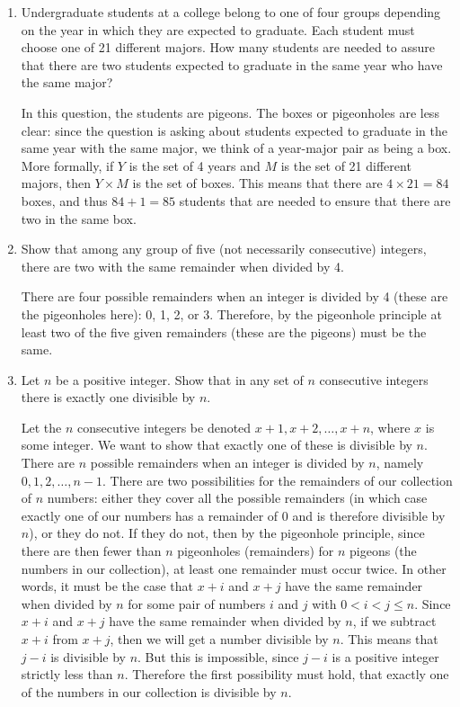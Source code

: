 \documentclass[11pt]{article}
\begin{document}
\begin{enumerate}[label=\textbf{\arabic*.}]
	\item Undergraduate students at a college belong to one of four groups depending on the year in which they are expected to graduate. Each student must choose one of 21 different majors. How many students are needed to assure that there are two students expected to graduate in the same year who have the same major?
	
	In this question, the students are pigeons. The boxes or pigeonholes are less clear: since the question is asking about students expected to graduate in the same year with the same major, we think of a year-major pair as being a box. More formally, if $Y$ is the set of 4 years and $M$ is the set of 21 different majors, then $Y \times M$ is the set of boxes. This means that there are $4 \times 21 = 84$ boxes, and thus $84 + 1 = 85$ students that are needed to ensure that there are two in the same box.
	
	\item Show that among any group of five (not necessarily consecutive) integers, there are two with the same remainder when divided by 4.
	
	There are four possible remainders when an integer is divided by 4 (these are the pigeonholes here): 0, 1, 2, or 3. Therefore, by the pigeonhole principle at least two of the five given remainders (these are the pigeons) must be the same.
	
	\item Let $n$ be a positive integer. Show that in any set of $n$ consecutive integers there is exactly one divisible by $n$.
	
	Let the $n$ consecutive integers be denoted $x + 1, x + 2, \ldots, x + n$, where $x$ is some integer. We want to show that exactly one of these is divisible by $n$. There are $n$ possible remainders when an integer is divided by $n$, namely $0, 1, 2, \ldots, n - 1$. There are two possibilities for the remainders of our collection of $n$ numbers: either they cover all the possible remainders (in which case exactly one of our numbers has a remainder of 0 and is therefore divisible by $n$), or they do not. If they do not, then by the pigeonhole principle, since there are then fewer than $n$ pigeonholes (remainders) for $n$ pigeons (the numbers in our collection), at least one remainder must occur twice. In other words, it must be the case that $x + i$ and $x + j$ have the same remainder when divided by $n$ for some pair of numbers $i$ and $j$ with $0 < i < j \leq n$. Since $x + i$ and $x + j$ have the same remainder when divided by $n$, if we subtract $x + i$ from $x + j$, then we will get a number divisible by $n$. This means that $j - i$ is divisible by $n$. But this is impossible, since $j - i$ is a positive integer strictly less than $n$. Therefore the first possibility must hold, that exactly one of the numbers in our collection is divisible by $n$.
	

\end{enumerate}
\end{document}
